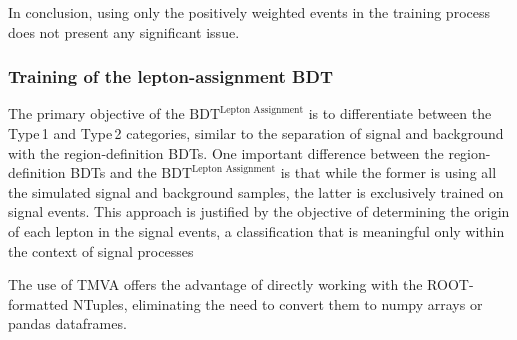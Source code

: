 In conclusion, using only the positively weighted events in the training 
process does not present any significant issue.





\subsubsection{Training of the lepton-assignment BDT}
\label{sec:ChaptH:Sig:LepAsign:SS:BDT:Training}
The primary objective of the $\text{BDT}^{\text{Lepton Assignment}}$ is to differentiate 
between the Type$\,$1 and Type$\,$2 categories, similar to the separation 
of signal and background with the region-definition BDTs. %
One important
difference between the region-definition BDTs and the $\text{BDT}^{\text{Lepton Assignment}}$
is that while the former is using all the simulated signal and background samples, the latter is exclusively trained 
on \dilepSStau signal events. This approach is justified by the objective of 
determining the origin of each lepton in the signal events, a classification 
that is meaningful only within the context of signal processes

 
The use of TMVA offers the advantage of directly 
working with the ROOT-formatted NTuples, eliminating the need to 
convert them to numpy arrays or pandas dataframes.


